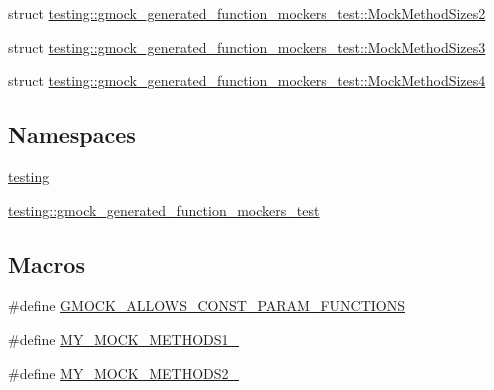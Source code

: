 \begin{DoxyCompactItemize}
\item 
struct \mbox{\hyperlink{structtesting_1_1gmock__generated__function__mockers__test_1_1_mock_method_sizes2}{testing\+::gmock\+\_\+generated\+\_\+function\+\_\+mockers\+\_\+test\+::\+Mock\+Method\+Sizes2}}
\item 
struct \mbox{\hyperlink{structtesting_1_1gmock__generated__function__mockers__test_1_1_mock_method_sizes3}{testing\+::gmock\+\_\+generated\+\_\+function\+\_\+mockers\+\_\+test\+::\+Mock\+Method\+Sizes3}}
\item 
struct \mbox{\hyperlink{structtesting_1_1gmock__generated__function__mockers__test_1_1_mock_method_sizes4}{testing\+::gmock\+\_\+generated\+\_\+function\+\_\+mockers\+\_\+test\+::\+Mock\+Method\+Sizes4}}
\end{DoxyCompactItemize}
\subsection*{Namespaces}
\begin{DoxyCompactItemize}
\item 
 \mbox{\hyperlink{namespacetesting}{testing}}
\item 
 \mbox{\hyperlink{namespacetesting_1_1gmock__generated__function__mockers__test}{testing\+::gmock\+\_\+generated\+\_\+function\+\_\+mockers\+\_\+test}}
\end{DoxyCompactItemize}
\subsection*{Macros}
\begin{DoxyCompactItemize}
\item 
\#define \mbox{\hyperlink{_obj__test_2lib_2googletest-release-1_88_81_2googlemock_2test_2gmock-generated-function-mockers__test_8cc_af5ea000ce48c75251a5542898a872339}{G\+M\+O\+C\+K\+\_\+\+A\+L\+L\+O\+W\+S\+\_\+\+C\+O\+N\+S\+T\+\_\+\+P\+A\+R\+A\+M\+\_\+\+F\+U\+N\+C\+T\+I\+O\+NS}}
\item 
\#define \mbox{\hyperlink{_obj__test_2lib_2googletest-release-1_88_81_2googlemock_2test_2gmock-generated-function-mockers__test_8cc_a9ae68063487fddb9f678e66728fae155}{M\+Y\+\_\+\+M\+O\+C\+K\+\_\+\+M\+E\+T\+H\+O\+D\+S1\+\_\+}}
\item 
\#define \mbox{\hyperlink{_obj__test_2lib_2googletest-release-1_88_81_2googlemock_2test_2gmock-generated-function-mockers__test_8cc_ac36252ad7584222cebc036d56465d652}{M\+Y\+\_\+\+M\+O\+C\+K\+\_\+\+M\+E\+T\+H\+O\+D\+S2\+\_\+}}
\end{DoxyCompactItemize}
